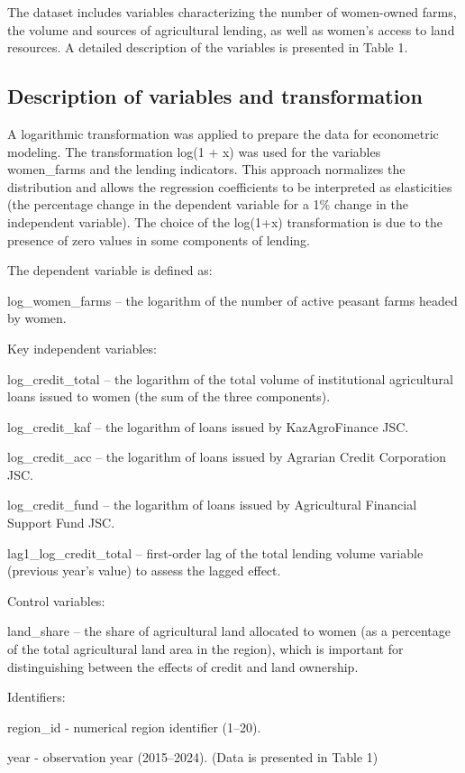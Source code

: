 ﻿\documentclass[pdflatex,sn-mathphys-ay]{sn-jnl}
\begin{document}
The dataset includes variables characterizing the number of women-owned
farms, the volume and sources of agricultural lending, as well as
women's access to land resources. A detailed description of the
variables is presented in Table 1.

\subsection{Description of variables and transformation}

A logarithmic transformation was applied to prepare the data for
econometric modeling. The transformation log(1 + x) was used for the
variables women\_farms and the lending indicators. This approach
normalizes the distribution and allows the regression coefficients to be
interpreted as elasticities (the percentage change in the dependent
variable for a 1\% change in the independent variable). The choice of
the log(1+x) transformation is due to the presence of zero values in
some components of lending.

The dependent variable is defined as:

log\_women\_farms -- the logarithm of the number of active peasant farms
headed by women.

Key independent variables:

log\_credit\_total -- the logarithm of the total volume of institutional
agricultural loans issued to women (the sum of the three components).

log\_credit\_kaf -- the logarithm of loans issued by KazAgroFinance JSC.

log\_credit\_acc -- the logarithm of loans issued by Agrarian Credit
Corporation JSC.

log\_credit\_fund -- the logarithm of loans issued by Agricultural
Financial Support Fund JSC.

lag1\_log\_credit\_total -- first-order lag of the total lending volume
variable (previous year's value) to assess the lagged effect.

Control variables:

land\_share -- the share of agricultural land allocated to women (as a
percentage of the total agricultural land area in the region), which is
important for distinguishing between the effects of credit and land
ownership.

Identifiers:

region\_id - numerical region identifier (1--20).

year - observation year (2015--2024). (Data is presented in Table 1)
\end{document}
